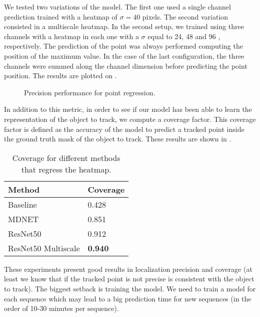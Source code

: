 We tested two variations of the model.
The first one used a single channel prediction trained with a heatmap of $\sigma = 40$ pixels.
The second variation consisted in a multiscale heatmap.
In the second setup, we trained using three channels with a heatmap in each one with a $\sigma$ equal to 24, 48 and 96 , respectively.
The prediction of the point was always performed computing the position of the maximum value.
In the case of the last configuration, the three channels were summed along the channel dimension before predicting the point position.
The results are plotted on .

\begin{figure}[h]
	\centering
	
	\caption{Precision performance for point regression.}
  \label{fig:experiments:tracking:pointregression}
\end{figure}

In addition to this metric, in order to see if our model has been able to learn the representation of the object to track, we compute a coverage factor.
This coverage factor is defined as the accuracy of the model to predict a tracked point inside the ground truth mask of the object to track.
These results are shown in .

\begin{table}[h]
  \centering
  \begin{tabular}{l|l}
    \toprule
    Method              & Coverage       \\
    \midrule
    Baseline            & 0.428          \\
    MDNET               & 0.851          \\
    ResNet50            & 0.912          \\
    ResNet50 Multiscale & \textbf{0.940} \\
    \bottomrule
  \end{tabular}
  \caption{Coverage for different methods that regress the heatmap. }
  \label{tab:experiments:tracking:coveragepointregression}
\end{table}

These experiments present good results in localization precision and coverage (at least we know that if the tracked point is not precise is consistent with the object to track).
The biggest setback is training the model.
We need to train a model for each sequence which may lead to a big prediction time for new sequences (in the order of 10-30 minutes per sequence).

